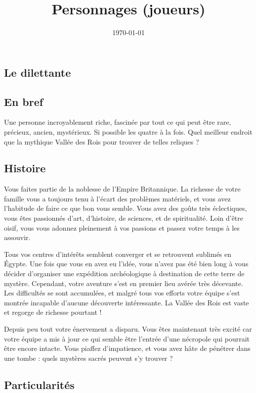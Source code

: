 \documentclass[11pt]{article}
\date{\today}
\title{Personnages (joueurs)}
\begin{document}
\begin{twocols}
\section{Le dilettante}
\label{sec:org26e6cab}

\subsection{En bref}
\label{sec:org4612563}

Une personne incroyablement riche, fascinée par tout ce qui peut être rare, précieux, ancien, mystérieux. Si possible les quatre à la fois. Quel meilleur endroit que la mythique Vallée des Rois pour trouver de telles reliques ?

\subsection{Histoire}
\label{sec:org57f30ae}

Vous faites partie de la noblesse de l'Empire Britannique. La richesse de votre famille vous a toujours tenu à l'écart des problèmes matériels, et vous avez l'habitude de faire ce que bon vous semble. Vous avez des goûts très éclectiques, vous êtes passionnés d'art, d'histoire, de sciences, et de spiritualité. Loin d'être oisif, vous vous adonnez pleinement à vos passions et passez votre temps à les assouvir.

Tous vos centres d'intérêts semblent converger et se retrouvent sublimés en Égypte. Une fois que vous en avez eu l'idée, vous n'avez pas été bien long à vous décider d'organiser une expédition archéologique à destination de cette terre de mystère. Cependant, votre aventure s'est en premier lieu avérée très décevante. Les difficultés se sont accumulées, et malgré tous vos efforts votre équipe s'est montrée incapable d'aucune découverte intéressante. La Vallée des Rois est vaste et regorge de richesse pourtant !

Depuis peu tout votre énervement a disparu. Vous êtes maintenant très excité car votre équipe a mis à jour ce qui semble être l'entrée d'une nécropole qui pourrait être encore intacte. Vous piaffez d'impatience, et vous avez hâte de pénétrer dans une tombe : quels mystères sacrés peuvent s'y trouver ?

\subsection{Particularités}
\label{sec:org51a0a05}


\end{twocols}
\end{document}

